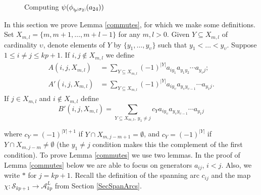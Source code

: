 \documentclass[11pt]{amsart}
\newcommand{\oarc}[4]{
\draw[thick, postaction={on each segment={mid arrow}}] (#1,#2) ..controls (#1 + .2,#2 + .7) and (#3 - .2,#4 + .7) .. (#3,#4);
}
\def\A{{\mathcal A}}
\def\s{{\sigma}}
\def\u{\upsilon}
\newcommand*{\subsmallp}[1]{\scalebox{.5}{\ensuremath#1}}
\newcommand{\subpp}[2][p]{\imath_{\hspace*{-1pt}#1}\hspace*{-.5pt}\subsmallp(#2\subsmallp)}
\theoremstyle{definition}
\begin{document}
{\begin{figure}[ht]
\caption{Computing $\psi(\phi_{\subpp{\s_2}}(a_{24}))$}
\label{FigCommutes}
\end{figure}

}%

In this section we prove Lemma \ref{commutes}, for which we make some definitions.  Set $X_{m,l} = \{m,m+1,\ldots,m+l-1\}$ for any $m,l>0$. Given $Y\subseteq X_{m,l}$ of cardinality $\u$, denote elements of $Y$ by $\{y_1,\ldots,y_\u\}$ such that $y_1<\ldots <y_\u$.  Suppose $1\le i\ne j\le kp+1$. If $i,j\not\in X_{m,l}$ we define
\begin{align*}
   A(i,j,X_{m,l})   &= \sum_{Y\subseteq X_{m,l}}(-1)^{|Y|}a_{iy_1}a_{y_1y_2}\cdots a_{y_\u j};\\
   A'(i,j,X_{m,l})  &= \sum_{Y\subseteq X_{m,l}}(-1)^{|Y|}a_{iy_\u}a_{y_\u y_{\u-1}}\cdots a_{y_1j}.
 \end{align*}
If $j\in X_{m,l}$ and $i\not\in X_{m,l}$ define
$$
B'(i,j,X_{m,l}) = \sum_{Y\subseteq X_{m,l},\ y_1\ne j}c_Ya_{iy_\u}a_{y_\u y_{\u-1}}\cdots a_{y_1j}
$$

\noindent where $c_Y = (-1)^{|Y|+1}$ if $Y\cap X_{m,j-m+1} = \emptyset$, and $c_Y = (-1)^{|Y|}$ if $Y\cap X_{m,j-m}\ne\emptyset$ (the $y_1\ne j$ condition makes this the complement of the first condition). To prove Lemma \ref{commutes} we use two lemmas. In the proof of Lemma \ref{commutes} below we are able to focus on generators $a_{ij}$, $i<j$. Also, we write $\ast$ for $j=kp+1$. Recall the definition of the spanning arc $c_{ij}$ and the map $\chi:\mathscr S_{kp+1}\to\A_{kp}^L$ from Section \ref{SecSpanArcs}.
\end{document}

